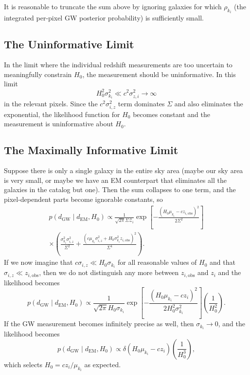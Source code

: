 \documentclass[modern]{article}
\newcommand{\dEM}{d_{\mathrm{EM}}}
\newcommand{\dGW}{d_{\mathrm{GW}}}
\begin{document}
It is reasonable to truncate the sum above by ignoring galaxies for which
$\rho_{k_i}$ (the integrated per-pixel \ac{GW} posterior probability) is
sufficiently small.

\subsection{The Uninformative Limit}

In the limit where the individual redshift measurements are too uncertain to
meaningfully constrain $H_0$, the measurement should be uninformative.  In this
limit
%
\begin{equation}
  H_0^2 \sigma_{k_i}^2 \ll c^2 \sigma_{z,i}^2 \to \infty
\end{equation}
%
in the relevant pixels.  Since the $c^2 \sigma_{i,z}^2$ term dominates $\Sigma$
and also eliminates the exponential, the likelihood function for $H_0$ becomes
constant and the measurement is uninformative about $H_0$.

\subsection{The Maximally Informative Limit}

Suppose there is only a single galaxy in the entire sky area (maybe our sky area
is very small, or maybe we have an \ac{EM} counterpart that eliminates all the
galaxies in the catalog but one).  Then the sum collapses to one term, and the
pixel-dependent parts become ignorable constants, so
%
\begin{multline}
  p\left( \dGW \mid \dEM, H_0 \right) \propto \frac{1}{\sqrt{2\pi} \Sigma \mathcal{Z}_i} \exp\left[ -\frac{\left(H_0 \mu_{k_i} - c z_{i,\mathrm{obs}}\right)^2}{2 \Sigma^2} \right] \\ \times \left( \frac{\sigma_{k_i}^2 \sigma_{i,z}^2}{\Sigma^2} + \frac{\left( c \mu_{k_i} \sigma_{i,z}^2 + H_0 \sigma_{k_i}^2 z_{i,\mathrm{obs}} \right)^2}{\Sigma^4} \right).
\end{multline}
%
If we now imagine that $c \sigma_{i,z} \ll H_0 \sigma_{k_i}$ for all reasonable
values of $H_0$ and that $\sigma_{i,z} \ll z_{i,\mathrm{obs}}$, then we do not
distinguish any more between $z_{i,\mathrm{obs}}$ and $z_i$ and the likelihood
becomes
%
\begin{equation}
  p\left( \dGW \mid \dEM, H_0 \right) \propto \frac{1}{\sqrt{2\pi} H_0 \sigma_{k_i}} \exp\left[ -\frac{\left(H_0 \mu_{k_i} - c z_{i}\right)^2}{2 H_0^2 \sigma_{k_i}^2} \right] \left( \frac{1}{H_0^2} \right).
\end{equation}
%
If the \ac{GW} measurement becomes infinitely precise as well, then
$\sigma_{k_i} \to 0$, and the likelihood becomes
%
\begin{equation}
  p\left( \dGW \mid \dEM, H_0 \right) \propto \delta \left( H_0 \mu_{k_i} - c z_{i}\right) \left( \frac{1}{H_0^3} \right),
\end{equation}
%
which selects $H_0 = c z_i / \mu_{k_i}$ as expected.
\end{document}
